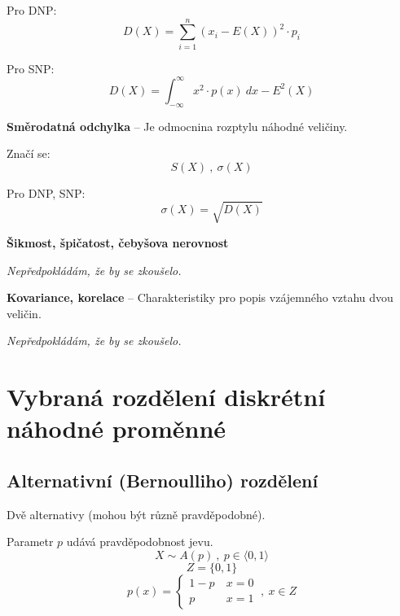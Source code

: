\begin{compactitem}
\begin{compactitem}
        \item Pro DNP:
        $$ D(X) = \sum_{i=1}^n {\left(x_i - E(X)\right)}^2 \cdot p_i $$

        \item Pro SNP:
        $$ D(X) = \int_{-\infty}^\infty x^2 \cdot p(x) ~ dx - E^2(X) $$
    \end{compactitem}

    \item \textbf{Směrodatná odchylka} -- Je odmocnina rozptylu náhodné veličiny. \begin{compactitem}
        \item Značí se:
        $$ S(X) ~,~ \sigma(X) $$

        \item Pro DNP, SNP:
        $$ \sigma(X) = \sqrt{D(X)} $$
    \end{compactitem}

    \item \textbf{Šikmost, špičatost, čebyšova nerovnost} \begin{compactitem}
        \item \textit{Nepředpokládám, že by se zkoušelo.}
    \end{compactitem}

    \item \textbf{Kovariance, korelace} -- Charakteristiky pro popis vzájemného vztahu dvou veličin. \begin{compactitem}
        \item \textit{Nepředpokládám, že by se zkoušelo.}
    \end{compactitem}
\end{compactitem}


\section{Vybraná rozdělení diskrétní náhodné proměnné}

\subsection{Alternativní (Bernoulliho) rozdělení}

\begin{compactitem}
    \item Dvě alternativy (mohou být různě pravděpodobné).
    \item Parametr $p$ udává pravděpodobnost jevu.
    $$ X \sim A(p) ~,~ p \in \langle 0, 1 \rangle $$
    $$ Z = \{ 0, 1 \}$$
    $$ p(x) = \left\{
        \begin{array}{ll}
            1-p ~ & x = 0 \\
            p   ~ & x = 1
        \end{array}
        \right. ~,~ x \in Z
    $$
\end{compactitem}

